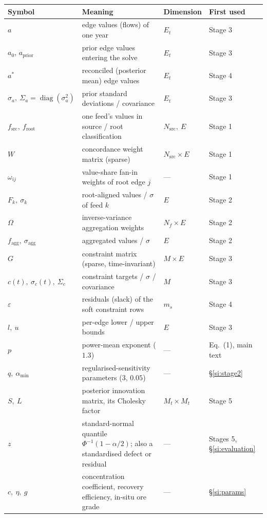 \documentclass[11pt]{article}
\newcommand{\diag}{\operatorname{diag}}
\begin{document}
\begin{table}[h]
\centering\small
\begin{tabular}{@{}llll@{}}
\toprule
Symbol & Meaning & Dimension & First used \\
\midrule
$a$ & edge values (flows) of one year & $E_t$ & Stage 3 \\
$a_0$, $a_{\mathrm{prior}}$ & prior edge values entering the solve & $E_t$ & Stage 3 \\
$a^*$ & reconciled (posterior mean) edge values & $E_t$ & Stage 4 \\
$\sigma_a,\ \Sigma_a=\diag(\sigma_a^2)$ & prior standard deviations / covariance & $E_t$ & Stage 3 \\
$f_{\mathrm{src}},\ f_{\mathrm{root}}$ & one feed's values in source / root classification & $N_{\mathrm{src}},\ E$ & Stage 1 \\
$W$ & concordance weight matrix (sparse) & $N_{\mathrm{src}}\times E$ & Stage 1 \\
$\omega_{ij}$ & value-share fan-in weights of root edge $j$ & --- & Stage 1 \\
$F_k,\ \sigma_k$ & root-aligned values / $\sigma$ of feed $k$ & $E$ & Stage 2 \\
$\Omega$ & inverse-variance aggregation weights & $N_f\times E$ & Stage 2 \\
$f_{\mathrm{agg}},\ \sigma_{\mathrm{agg}}$ & aggregated values / $\sigma$ & $E$ & Stage 2 \\
$G$ & constraint matrix (sparse, time-invariant) & $M\times E$ & Stage 3 \\
$c(t),\ \sigma_c(t),\ \Sigma_c$ & constraint targets / $\sigma$ / covariance & $M$ & Stage 3 \\
$\varepsilon$ & residuals (slack) of the soft constraint rows & $m_s$ & Stage 4 \\
$l,\ u$ & per-edge lower / upper bounds & $E$ & Stage 3 \\
$p$ & power-mean exponent ($1.3$) & --- & Eq.~(1), main text \\
$q,\ \alpha_{\min}$ & regularised-sensitivity parameters ($3$, $0.05$) & --- & \S\ref{si:stage2} \\
$S,\ L$ & posterior innovation matrix, its Cholesky factor & $M_t\times M_t$ & Stage 5 \\
$z$ & standard-normal quantile $\Phi^{-1}(1-\alpha/2)$; also a standardised defect or residual & --- & Stages 5, \S\ref{si:evaluation} \\
$c,\ \eta,\ g$ & concentration coefficient, recovery efficiency, in-situ ore grade & --- & \S\ref{si:params} \\

\end{tabular}
\end{table}
\end{document}
